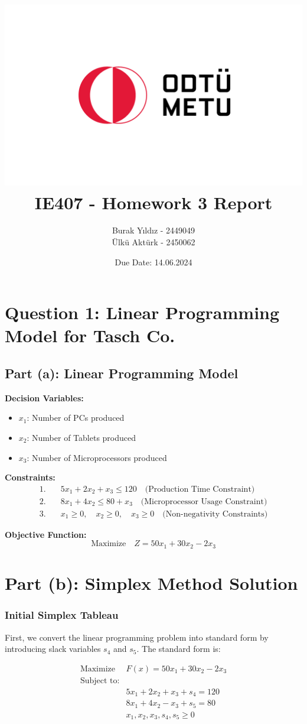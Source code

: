 \documentclass[12pt]{article}
\title{\includegraphics{9.4.png}\\ IE407 - Homework 3 Report}
\author{Burak Yıldız - 2449049 \\ Ülkü Aktürk - 2450062}
\date{Due Date: 14.06.2024}
\begin{document}
\maketitle
\newpage

\section*{Question 1: Linear Programming Model for Tasch Co.}

\subsection*{Part (a): Linear Programming Model}

\textbf{Decision Variables:}
\begin{itemize}
    \item \( x_1 \): Number of PCs produced
    \item \( x_2 \): Number of Tablets produced
    \item \( x_3 \): Number of Microprocessors produced
\end{itemize}

\textbf{Constraints:}
\begin{align*}
    1. & \quad 5x_1 + 2x_2 + x_3 \leq 120 \quad \text{(Production Time Constraint)} \\
    2. & \quad 8x_1 + 4x_2 \leq 80 + x_3 \quad \text{(Microprocessor Usage Constraint)} \\
    3. & \quad x_1 \geq 0, \quad x_2 \geq 0, \quad x_3 \geq 0 \quad \text{(Non-negativity Constraints)}
\end{align*}

\textbf{Objective Function:}
\[
\text{Maximize} \quad Z = 50x_1 + 30x_2 - 2x_3
\]

\section*{Part (b): Simplex Method Solution}

\subsubsection*{Initial Simplex Tableau}

First, we convert the linear programming problem into standard form by introducing slack variables \(s_4\) and \(s_5\). The standard form is:

\[
\begin{aligned}
\text{Maximize } & F(x) = 50x_1 + 30x_2 - 2x_3 \\
\text{Subject to:} \\
& 5x_1 + 2x_2 + x_3 + s_4 = 120 \\
& 8x_1 + 4x_2 - x_3 + s_5 = 80 \\
& x_1, x_2, x_3, s_4, s_5 \geq 0
\end{aligned}
\]
\end{document}
